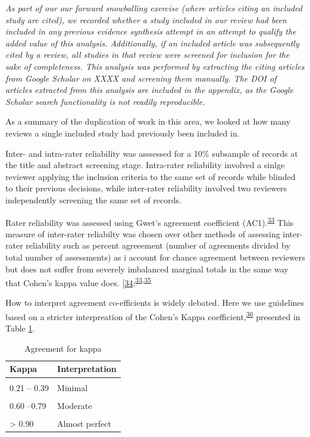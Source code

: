 \documentclass[a4paper, twoside]{templates/ociamthesis}
\begin{document}
\emph{As part of our our forward snowballing exercise (where articles citing an included study are cited), we recorded whether a study included in our review had been included in any previous evidence synthesis attempt in an attempt to qualify the added value of this analysis. Additionally, if an included article was subsequently cited by a review, all studies in that review were screened for inclusion for the sake of completeness. This analysis was performed by extracting the citing articles from Google Scholar on XXXX and screening them manually. The DOI of articles extracted from this analysis are included in the appendix, as the Google Scholar search functionality is not readily reproducible.}

As a summary of the duplication of work in this area, we looked at how many reviews a single included study had previously been included in.

Inter- and intra-rater reliability was asssessed for a 10\% subsample of records at the title and abstract screening stage. Intra-rater reliability involved a sinlge reviewer applying the inclusion criteria to the same set of records while blinded to their previous decisions, while inter-rater reliability involved two reviewers independently screening the same set of records.

Rater reliability was assessed using Gwet's agreement coefficient (AC1).\textsuperscript{\protect\hyperlink{ref-gwet2008}{33}} This measure of inter-rater reliabilty was chosen over other methods of assessing inter-rater reliability such as percent agreeement (number of agreements divided by total number of assessments) as i account for chance agreement between reviewers but does not suffer from severely imbalanced marginal totals in the same way that Cohen's kappa value does. {[}\protect\hyperlink{ref-cohen1960}{34}:\textsuperscript{\protect\hyperlink{ref-gwet2008}{33},\protect\hyperlink{ref-wongpakaran2013}{35}}

How to interpret agreement co-efficients is widely debated. Here we use guidelines based on a stricter interpreation of the Cohen's Kappa coefficient,\textsuperscript{\protect\hyperlink{ref-mchugh2012}{36}} presented in Table \ref{tab:gwet-table}.

\begin{table}[!h]

\caption{\label{tab:gwet-table}Agreement for kappa}
\centering
\begin{tabular}[t]{ll}
\toprule
Kappa & Interpretation\\
\midrule
\cellcolor{gray!6}{0 – 0.20} & \cellcolor{gray!6}{None}\\
0.21 – 0.39 & Minimal\\
\cellcolor{gray!6}{0.40 –.59} & \cellcolor{gray!6}{Weak}\\
0.60 –0.79 & Moderate\\
\cellcolor{gray!6}{0.80–0.90} & \cellcolor{gray!6}{Strong}\\
\addlinespace
> 0.90 & Almost perfect\\
\bottomrule
\end{tabular}
\end{table}
\end{document}
